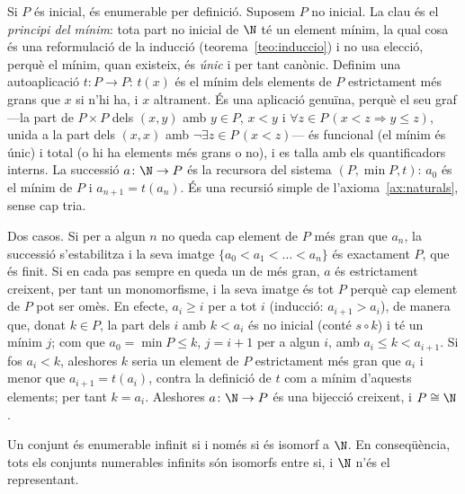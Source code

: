 \begin{prova}
Si \(P\) és inicial, és enumerable per definició. Suposem \(P\) no
inicial. La clau és el \emph{principi del mínim}: tota part no inicial de
\(\N\) té un element mínim, la qual cosa és una reformulació de la
inducció (teorema~\ref{teo:induccio}) i no usa elecció, perquè el mínim,
quan existeix, és \emph{únic} i per tant canònic. Definim una autoaplicació \(t\colon P\to P\): \(t(x)\) és el mínim dels
elements de \(P\) estrictament més grans que \(x\) si n'hi ha, i \(x\)
altrament. És una aplicació genuïna, perquè el seu graf ---la part de
\(P\times P\) dels \((x,y)\) amb \(y\in P\), \(x<y\) i
\(\forall z\in P\,(x<z\Rightarrow y\le z)\), unida a la part dels \((x,x)\)
amb \(\neg\exists z\in P\,(x<z)\)--- és funcional (el mínim és únic) i
total (o hi ha elements més grans o no), i es talla amb els
quantificadors interns. La successió \(a\colon\N\to P\) és la recursora
del sistema \((P,\min P,t)\): \(a_0\) és el mínim de \(P\) i
\(a_{n+1}=t(a_n)\). És una recursió simple de l'axioma~\ref{ax:naturals},
sense cap tria.

Dos casos. Si per a algun \(n\) no queda cap element de \(P\) més gran que
\(a_n\), la successió s'estabilitza i la seva imatge
\(\{a_0<a_1<\dots<a_n\}\) és exactament \(P\), que és finit. Si en cada pas
sempre en queda un de més gran, \(a\) és estrictament creixent, per tant
un monomorfisme, i la seva imatge és tot \(P\) perquè cap element de \(P\)
pot ser omès. En efecte, \(a_i\ge i\) per a tot \(i\) (inducció: \(a_{i+1}>a_i\)),
de manera que, donat \(k\in P\), la part dels \(i\) amb \(k<a_i\) és no
inicial (conté \(s\circ k\)) i té un mínim \(j\); com que \(a_0=\min P\le k\),
\(j=i+1\) per a algun \(i\), amb \(a_i\le k<a_{i+1}\). Si fos \(a_i<k\), aleshores
\(k\) seria un element de \(P\) estrictament més gran que \(a_i\) i menor que
\(a_{i+1}=t(a_i)\), contra la definició de \(t\) com a mínim d'aquests
elements; per tant \(k=a_i\). Aleshores
\(a\colon\N\to P\) és una bijecció creixent, i \(P\cong\N\).
\end{prova}

\begin{corollari}\label{cor:enumerable-infinit-N}
Un conjunt és enumerable infinit si i només si és isomorf a \(\N\). En
conseqüència, tots els conjunts numerables infinits són isomorfs entre si,
i \(\N\) n'és el representant.
\end{corollari}

